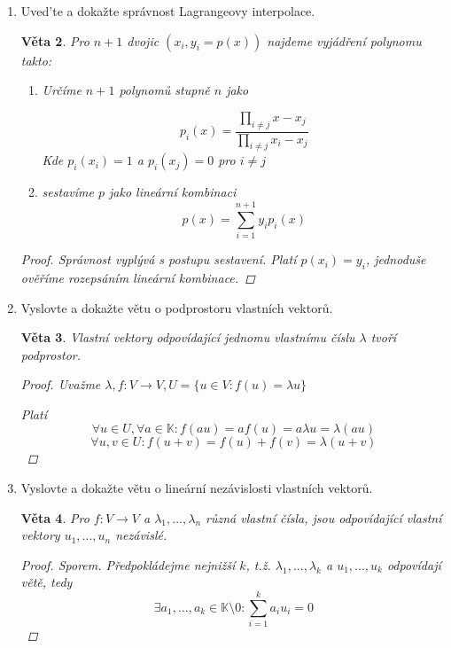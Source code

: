 \documentclass[10pt,a4paper]{article}
\theoremstyle{plain}
\newtheorem{veta}{Věta}
\theoremstyle{definition}
\begin{document}
\begin{enumerate}
\begin{veta}
\begin{proof}
\[ \det(V_{n+1}) = \prod^n_{i=1} (x_i - x_0) \det(V_n) \]

Tento rekurentní vztah dává

\[ \det(V_{n+1}) = \prod^n_{i < j} (x_j - x_i) \]

Tento výraz je nenulový, pokud žádný součinitel není nulový.

\end{proof}
\end{veta}

\item Uved'te a dokažte správnost Lagrangeovy interpolace.
\begin{veta}

Pro $n+1$ dvojic $(x_i, y_i=p(x))$ najdeme vyjádření polynomu takto:

\begin{enumerate}
\item Určíme $n+1$ polynomů stupně $n$ jako

\[ p_i(x) = \frac{\prod_{i \neq j} x - x_j}{\prod_{i \neq j} x_i - x_j}\]
Kde $p_i(x_i) = 1$ a $p_i(x_j) = 0$  pro $i \neq j$
\item sestavíme $p$ jako lineární kombinaci
\[ p(x) = \sum^{n+1}_{i=1} y_ip_i(x) \]
\end{enumerate}

\begin{proof}
Správnost vyplývá s postupu sestavení. Platí $p(x_i) = y_i$, jednoduše ověříme rozepsáním lineární kombinace.
\end{proof}
\end{veta}

\item Vyslovte a dokažte větu o podprostoru vlastních vektorů.
\begin{veta}
Vlastní vektory odpovídající jednomu vlastnímu číslu $\lambda$ tvoří podprostor.
\begin{proof} Uvažme $\lambda, f: V \to V, U = \{u \in V: f(u) = \lambda u\}$

Platí \[ \forall u \in U, \forall a \in \mathbb{K}: f(au) = af(u) = a \lambda u = \lambda(au)  \]
\[ \forall u,v \in U: f(u+v) = f(u) + f(v) = \lambda (u + v) \]
\end{proof}
\end{veta}

\item Vyslovte a dokažte větu o lineární nezávislosti vlastních vektorů.
\begin{veta}
Pro $f: V \to V$ a $\lambda_1, ..., \lambda_n$ různá vlastní čísla, jsou  odpovídající vlastní vektory $u_1, ..., u_n$ nezávislé.
\begin{proof} Sporem.
Předpokládejme nejnižší $k$, t.ž. $\lambda_1, ..., \lambda_k$ a $u_1, ..., u_k$ odpovídají větě, tedy
\[ \exists a_1, ..., a_k \in \mathbb{K} \setminus 0: \sum^k_{i=1} a_i u_i = 0 \]


\end{proof}
\end{veta}
\end{enumerate}
\end{document}

